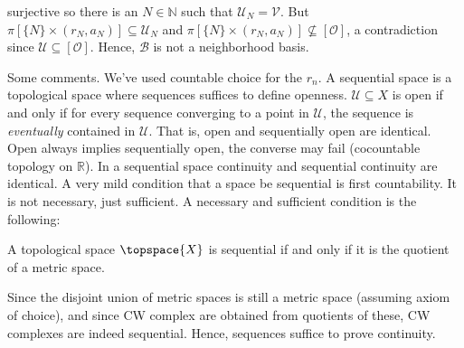 \documentclass{article}                                                        %
\begin{document}
    surjective so there is an $N\in\mathbb{N}$ such that
    $\mathcal{U}_{N}=\mathcal{V}$. But
    $\pi[\{N\}\times(r_{N},a_{N})]\subseteq\mathcal{U}_{N}$ and
    $\pi[\{N\}\times(r_{N},a_{N})]\nsubseteq[\mathcal{O}]$, a contradiction
    since $\mathcal{U}\subseteq[\mathcal{O}]$. Hence, $\mathcal{B}$ is not a
    neighborhood basis.
    \par\hfill\par
    Some comments. We've used countable choice for the $r_{n}$. A sequential
    space is a topological space where sequences suffices to define openness.
    $\mathcal{U}\subseteq{X}$ is open if and only if for every sequence
    converging to a point in $\mathcal{U}$, the sequence is \textit{eventually}
    contained in $\mathcal{U}$. That is, open and sequentially open are
    identical. Open always implies sequentially open, the
    converse may fail (cocountable topology on $\mathbb{R}$). In a sequential
    space continuity and sequential continuity are identical. A very mild
    condition that a space be sequential
    is first countability. It is not necessary, just sufficient. A necessary and
    sufficient condition is the following:
    \begin{theorem}
        A topological space $\topspace{X}$ is sequential if and only if it is
        the quotient of a metric space.
    \end{theorem}
    Since the disjoint union of metric spaces is still a metric space (assuming
    axiom of choice), and since CW complex are obtained from quotients of
    these, CW complexes are indeed sequential. Hence, sequences suffice to prove
    continuity.
\end{document}
